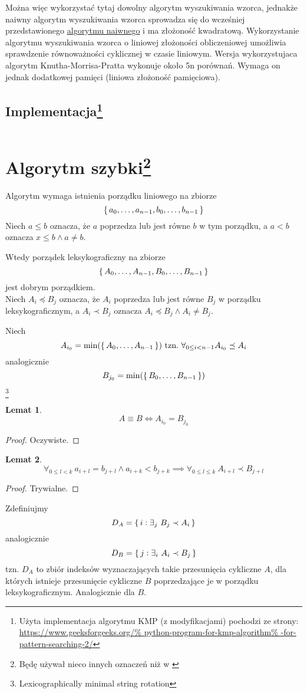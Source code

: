 \documentclass{scrartcl}
\theoremstyle{definition}
\theoremstyle{plain}
\theoremstyle{remark}
\theoremstyle{plain}
\newtheorem{lemma_equiv_if_lex_min_eq}{Lemat}[section]
\newtheorem{lemma_k_shift_greater}
[lemma_equiv_if_lex_min_eq]{Lemat}
\theoremstyle{definition}
\theoremstyle{plain}
\begin{document}
Można więc wykorzystać tytaj dowolny algorytm wyszukiwania wzorca,
jednakże naiwny algorytm wyszukiwania wzorca sprowadza się do
wcześniej przedstawionego
\hyperref[sec:naive_alg]{algorytmu naiwnego}
i ma złożoność kwadratową.
Wykorzystanie algorytmu wyszukiwania wzorca
o liniowej złożoności obliczeniowej
umożliwia sprawdzenie równoważności cyklicznej
w czasie liniowym.\cite{alg}
Wersja wykorzystujaca algorytm Knutha-Morrisa-Pratta
wykonuje około 5n porównań.\cite{shiloach1979}
Wymaga on jednak dodatkowej pamięci (liniowa złożoność pamięciowa).
\pagebreak
\subsection[Implementacja]{Implementacja\footnote{
		Użyta implementacja algorytmu KMP (z modyfikacjami)
		pochodzi ze strony:\\
		\url{https://www.geeksforgeeks.org/%
			python-program-for-kmp-algorithm%
			-for-pattern-searching-2/}
	}}
\inputminted[fontsize=\normalsize]{python3}{../implementacje/pattern_matching.py}
\pagebreak
\section[Algorytm szybki]{Algorytm szybki\footnote{
	  Będę używał nieco innych oznaczeń niż w \cite{shiloach1979}
  }}
Algorytm wymaga istnienia porządku liniowego na zbiorze
\[\set{a_0,\dots,a_{n-1},b_0,\dots,b_{n-1}}\]
Niech \(a\le b\) oznacza, że \(a\) poprzedza
lub jest równe \(b\) w tym porządku, a \(a< b\) oznacza
\(x\le b \land a\neq b\).

Wtedy porządek leksykograficzny
na zbiorze \[\set{A_0,\dots,A_{n-1},B_0,\dots,B_{n-1}}\]
jest dobrym porządkiem.\\
Niech \(A_i\preceq B_j\) oznacza, że \(A_i\) poprzedza
lub jest równe \(B_j\) w porządku leksykograficznym,
a \(A_i\prec B_j\) oznacza \(A_i\preceq B_j \land A_i\neq B_j\).

Niech
\[A_{i_0}=\min(\set{A_0,\dots,A_{n-1}})
	\ \text{tzn.}\ \forall_{0\le i<n-1}A_{i_0}\preceq A_i\]
analogicznie
\[B_{j_0}=\min(\set{B_0,\dots,B_{n-1}})\]\footnote{
	Lexicographically minimal string rotation
}
\begin{lemma_equiv_if_lex_min_eq}
	\label{lem:equivalence_if_lex_min_eq}
	\[A\equiv B \iff A_{i_0}=B_{j_0}\]
\end{lemma_equiv_if_lex_min_eq}
\begin{proof}
	Oczywiste.
\end{proof}
\begin{lemma_k_shift_greater}
	\label{lem:k_shift_greater}
	\[\forall_{0\le l<k}\ a_{i+l}=b_{j+l} \land a_{i+k}<b_{j+k}
		\implies \forall_{0\le l\le k}\ A_{i+l}\prec B_{j+l}\]
\end{lemma_k_shift_greater}
\begin{proof}
	Trywialne.
\end{proof}
Zdefiniujmy
\[D_A=\set{i:\exists_j\ B_j\prec A_i}\]
analogicznie
\[D_B=\set{j:\exists_i\ A_i\prec B_j}\]
tzn. \(D_A\) to zbiór indeksów
wyznaczających takie przesunięcia cykliczne \(A\),
dla których istnieje przesunięcie cykliczne \(B\)
poprzedzające je w porządku leksykograficznym.
Analogicznie dla \(B\).
\pagebreak
\end{document}
